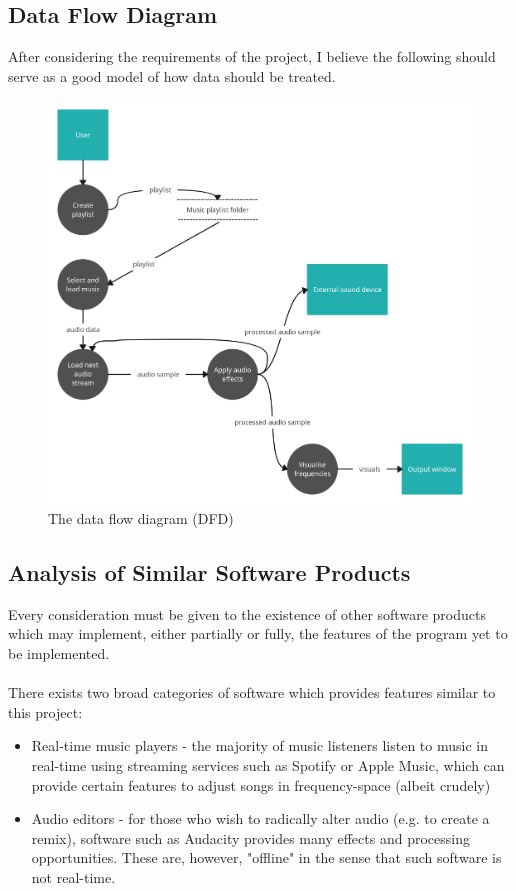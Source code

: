 \pagebreak
\subsection{Data Flow Diagram}
After considering the requirements of the project, I believe the following should serve as a good model of how data should be treated.

\begin{figure}[h]
	\includegraphics[width=13cm]{./DFD.png}
	\caption{The data flow diagram (DFD)}
\end{figure}

\pagebreak
\subsection{Analysis of Similar Software Products}
Every consideration must be given to the existence of other software products which may implement, either partially or fully, the features of the program yet to be implemented.

\paragraph{}
There exists two broad categories of software which provides features similar to this project:
\begin{itemize}
	\item Real-time music players - the majority of music listeners listen to music in real-time using streaming services such as Spotify or Apple Music, which can provide certain features to adjust songs in frequency-space (albeit crudely)

	\item Audio editors - for those who wish to radically alter audio (e.g. to create a remix), software such as Audacity provides many effects and processing opportunities. These are, however, "offline" in the sense that such software is not real-time.
\end{itemize}

